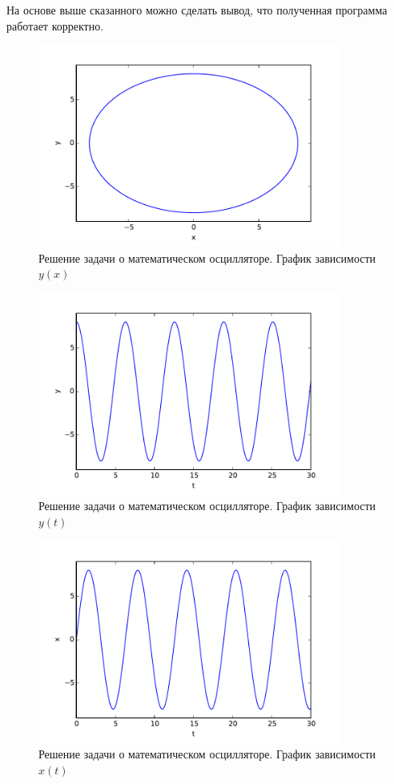 На основе выше сказанного можно сделать вывод, что полученная программа работает корректно.
\newpage
\begin{figure}[H]
\centering
    \includegraphics[width=100mm]{pictures/x-y.pdf}
    \caption{Решение задачи о математическом осцилляторе. График зависимости $y(x)$}
    \label{x-y}
\end{figure}
\begin{figure}[H]
\centering
    \includegraphics[width=100mm]{pictures/t-y.pdf}
    \caption{Решение задачи о математическом осцилляторе. График зависимости $y(t)$}
    \label{t-y} 
\end{figure}
\begin{figure}[H]
\centering
    \includegraphics[width=100mm]{pictures/t-x.pdf}
    \caption{Решение задачи о математическом осцилляторе. График зависимости $x(t)$}
    \label{t-x}
\end{figure}
